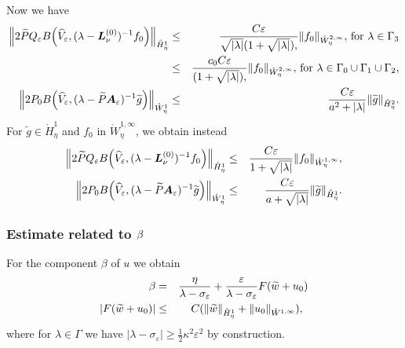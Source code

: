 \documentclass[11pt]{article}
\begin{document}
Now we have
\begin{eqnarray*}
\Bigl\|2\widetilde{P}Q_{\varepsilon }B \Bigl( \widehat{V}_{\varepsilon },(\lambda -%
\boldsymbol{L}_{\nu }^{(0)})^{-1}f_{0} \Bigr) \Bigr\|_{\mathring{H}_{\eta}^{1}} &\leq &%
\frac{C\varepsilon }{\sqrt{|\lambda |}(1 +\sqrt{|\lambda |}),%
}\|f_{0}\|_{\mathring{W}_{\eta}^{2,\infty }}, \, \hbox{for } \lambda \in \Gamma_3
\\
&\leq &%
\frac{c_0 C\varepsilon }{(1 +\sqrt{|\lambda |}),%
}\|f_{0}\|_{\mathring{W}_{\eta}^{2,\infty }}, \, \hbox{for } \lambda \in \Gamma_0 \cup \Gamma_1 \cup \Gamma_2,
\\
\Bigl\|2P_{0}B \Bigl(\widehat{V}_{\varepsilon },(\lambda -\widetilde{P}\boldsymbol{A}%
_{\varepsilon })^{-1}\widetilde{g}\Bigr) \Bigr\|_{\mathring{W}_{\eta}^{1}} &\leq &\frac{%
C\varepsilon }{a^{2}+|\lambda |}\|\widetilde{g}\|_{\mathring{H}_{\eta}^{2}}.
\end{eqnarray*}%
For $\widetilde{g}\in \mathring{H}_{\eta}^{1}$ and $f_{0}$ in $\mathring{W}%
_{\eta}^{1,\infty }$, we obtain instead%
\begin{eqnarray*}
\Bigl\|2\widetilde{P}Q_{\varepsilon }B \Bigl(\widehat{V}_{\varepsilon },(\lambda -%
\boldsymbol{L}_{\nu }^{(0)})^{-1}f_{0} \Bigr) \Bigr\|_{\mathring{H}_{\eta}^{1}} &\leq &%
\frac{C\varepsilon }{1 +\sqrt{|\lambda |}}\|f_{0}\|_{%
\mathring{W}_{\eta}^{1,\infty }}, \\
\Bigl\|2P_{0}B \Bigl( \widehat{V}_{\varepsilon },(\lambda -\widetilde{P}\boldsymbol{A}%
_{\varepsilon })^{-1}\widetilde{g} \Bigr) \Bigr\|_{\mathring{W}_{\eta}^{1}} &\leq &\frac{%
C\varepsilon }{a+\sqrt{|\lambda |}}\|\widetilde{g}\|_{\mathring{H}_{\eta}^{1}}.
\end{eqnarray*}

\subsubsection{Estimate related to $\protect\beta $}

For the component $\beta $ of $u$ we obtain%
\begin{eqnarray*}
\beta &=&\frac{\eta }{\lambda -\sigma _{\varepsilon }}+\frac{\varepsilon }{%
\lambda -\sigma _{\varepsilon }}F(\widetilde{w}+u_{0}) \\
|F(\widetilde{w}+u_{0})| &\leq &C(\|\widetilde{w}\|_{\mathring{H}%
_{\eta}^{1}}+\|u_{0}\|_{\mathring{W}^{1,\infty }}),\text{ }
\end{eqnarray*}%
where for $\lambda \in \Gamma $ we have $|\lambda -\sigma _{\varepsilon
}|\geq \frac{1}{2}\kappa ^{2}\varepsilon ^{2}$ by construction.
\end{document}

